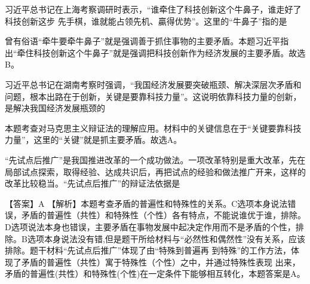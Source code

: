 \question 习近平总书记在上海考察调研时表示，``谁牵住了科技创新这个牛鼻子，谁走好了科技创新这步
先手棋，谁就能占领先机、贏得优势''。这里的``牛鼻子''指的是
\par{}
\begin{solution}曾有俗语``牵牛要牵牛鼻子''就是强调善于抓住事物的主要矛盾。本题习近平指出``牵住科技创新这个牛鼻子''就是强调把科技创新作为经济发展的主要矛盾。故选B。
\end{solution}
\question 习近平总书记在湖南考察时强调，``我国经济发展要突破瓶颈、解决深层次矛盾和问题，根本出路在于创新，关键是要靠科技力量''。这说明依靠科技力量的创新，是解决我国经济发展瓶颈的
\par{}
\begin{solution}本题考查对马克思主义辩证法的理解应用。材料中的关键信息在于``关键要靠科技力量''，这里的``关键''就是抓主要矛盾。故选A。
\end{solution}
\question ``先试点后推广''是我国推进改革的一个成功做法。一项改革特别是重大改革，先在局部试点探索，取得经验、达成共识后，再把试点的经验和做法推广开来，这样的改革比较稳当。``先试点后推广''的辩证法依据是
\par{}
\begin{solution}【答案】A
【解析】本题考查矛盾的普遍性和特殊性的关系。C选项本身说法错误，矛盾的普遍性（共性）和特殊性（个性）各有特点，不能说谁优于谁，排除。D选项说法本身也错误，主要矛盾在事物发展中起决定作用而不是矛盾的个性，排除。B选项本身说法没有错,但是题干所给材料与``必然性和偶然性''没有关系，应该排除。题干材料``先试点后推广''体现了由``特殊到普遍再
到特殊''的工作方法，体现了矛盾的普遍性（共性）寓于特殊性（个性）之中，并通过特殊性表现
出来，矛盾的普遍性(共性）和特殊性(个性)在一定条件下能够相互转化，本题答案是A。
\end{solution}

